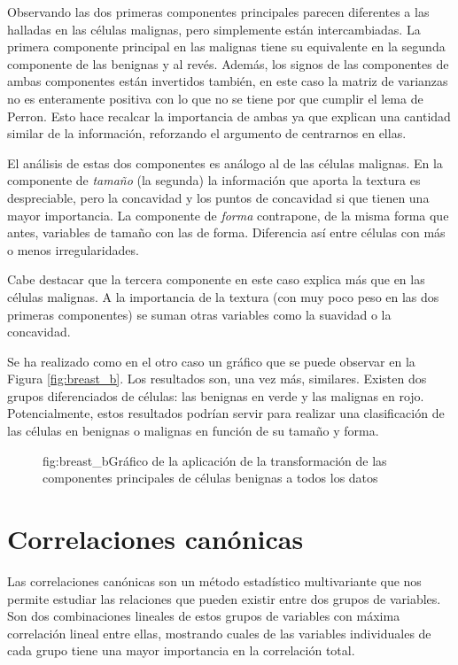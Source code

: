 \documentclass[tfg,cienciasbased,lot,lof,covers,final,overleaf,nocopyright]{tfgtfmthesisuam}
\begin{document}
Observando las dos primeras componentes principales parecen diferentes a las halladas en las células malignas, pero simplemente están intercambiadas. La primera componente principal en las malignas tiene su equivalente en la segunda componente de las benignas y al revés. Además, los signos de las componentes de ambas componentes están invertidos también, en este caso la matriz de varianzas no es enteramente positiva con lo que no se tiene por que cumplir el lema de Perron. Esto hace recalcar la importancia de ambas ya que explican una cantidad similar de la información, reforzando el argumento de centrarnos en ellas. 

El análisis de estas dos componentes es análogo al de las células malignas. En la componente de \textit{tamaño} (la segunda) la información que aporta la textura es despreciable, pero la concavidad y los puntos de concavidad si que tienen una mayor importancia. La componente de \textit{forma} contrapone, de la misma forma que antes, variables de tamaño con las de forma. Diferencia así entre células con más o menos irregularidades.

Cabe destacar que la tercera componente en este caso explica más que en las células malignas. A la importancia de la textura (con muy poco peso en las dos primeras componentes) se suman otras variables como la suavidad o la concavidad.

Se ha realizado como en el otro caso un gráfico que se puede observar en la Figura \ref{fig:breast_b}. Los resultados son, una vez más, similares. Existen dos grupos diferenciados de células: las benignas en verde y las malignas en rojo. Potencialmente, estos resultados podrían servir para realizar una clasificación de las células en benignas o malignas en función de su tamaño y forma.

\begin{figure}[Gráfico de la aplicación de la transformación de las componentes principales de células benignas a todos los datos]{fig:breast_b}{Gráfico de la aplicación de la transformación de las componentes principales de células benignas a todos los datos}
\end{figure}



\chapter{Correlaciones canónicas}
Las correlaciones canónicas son un método estadístico multivariante que nos permite estudiar las relaciones que pueden existir entre dos grupos de variables. Son dos combinaciones lineales de estos grupos de variables con máxima correlación lineal entre ellas, mostrando cuales de las variables individuales de cada grupo tiene una mayor importancia en la correlación total.
\end{document}
